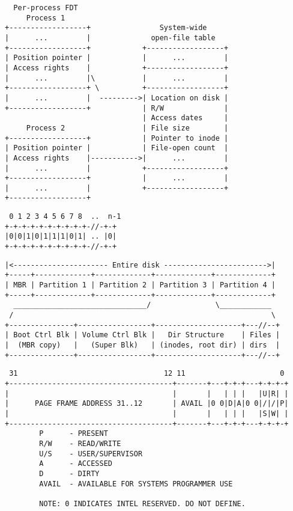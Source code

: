 \documentclass[varwidth,crop,multi={verbatim}]{standalone}
\begin{document}
\begin{verbatim}
  Per-process FDT
     Process 1
+------------------+                System-wide
|      ...         |              open-file table
+------------------+            +------------------+
| Position pointer |            |      ...         |
| Access rights    |            +------------------+
|      ...         |\           |      ...         |
+------------------+ \          +------------------+
|      ...         |  --------->| Location on disk |
+------------------+            | R/W              |
                                | Access dates     |
     Process 2                  | File size        |
+------------------+            | Pointer to inode |
| Position pointer |            | File-open count  |
| Access rights    |----------->|      ...         |
|      ...         |            +------------------+
+------------------+            |      ...         |
|      ...         |            +------------------+
+------------------+
\end{verbatim}

\begin{verbatim}
 0 1 2 3 4 5 6 7 8  ..  n-1
+-+-+-+-+-+-+-+-+-+-//-+-+
|0|0|1|0|1|1|1|0|1| .. |0|
+-+-+-+-+-+-+-+-+-+-//-+-+
\end{verbatim}

\begin{verbatim}
|<---------------------- Entire disk ------------------------>|
+-----+-------------+-------------+-------------+-------------+
| MBR | Partition 1 | Partition 2 | Partition 3 | Partition 4 |
+-----+-------------+-------------+-------------+-------------+
  _______________________________/               \____________
 /                                                            \
+---------------+-----------------+--------------------+---//--+
| Boot Ctrl Blk | Volume Ctrl Blk |   Dir Structure    | Files |
|  (MBR copy)   |   (Super Blk)   | (inodes, root dir) | dirs  |
+---------------+-----------------+--------------------+---//--+
\end{verbatim}

\begin{verbatim}
 31                                  12 11                      0
+--------------------------------------+-------+---+-+-+---+-+-+-+
|                                      |       |   | | |   |U|R| |
|      PAGE FRAME ADDRESS 31..12       | AVAIL |0 0|D|A|0 0|/|/|P|
|                                      |       |   | | |   |S|W| |
+--------------------------------------+-------+---+-+-+---+-+-+-+
        P      - PRESENT
        R/W    - READ/WRITE
        U/S    - USER/SUPERVISOR
        A      - ACCESSED
        D      - DIRTY
        AVAIL  - AVAILABLE FOR SYSTEMS PROGRAMMER USE

        NOTE: 0 INDICATES INTEL RESERVED. DO NOT DEFINE.
\end{verbatim}
\end{document}

